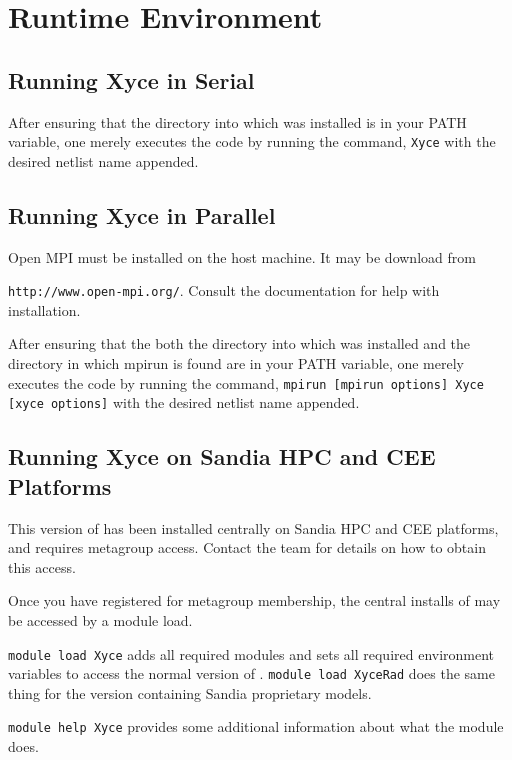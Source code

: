 \chapter{Runtime Environment}
\label{runtime}

\section{Running Xyce in Serial}

After ensuring that the directory into which \Xyce{} was installed is
in your PATH variable, one merely executes the code by running the
command, \texttt{Xyce} with the desired netlist name appended.

\section{Running Xyce in Parallel}

Open MPI must be installed on the host machine.  It may be download from 

\texttt{http://www.open-mpi.org/}.  Consult the documentation for help with installation.

After ensuring that the both the directory into which \Xyce{} was
installed and the directory in which mpirun is found are in your PATH
variable, one merely executes the code by running the command,
\texttt{mpirun [mpirun options] Xyce [xyce options]} with the desired
netlist name appended.

\section{Running Xyce on Sandia HPC and CEE Platforms}



This version of \Xyce{} has been installed centrally on Sandia HPC
and CEE platforms, and requires metagroup access.  Contact the \Xyce{} team
for details on how to obtain this access.

Once you have registered for metagroup membership, the central
installs of \Xyce{} may be accessed by a module load.

\verb+module load Xyce+ adds all required modules and sets all
required environment variables to access the normal version of
\Xyce{}.  \verb+module load XyceRad+ does the same thing for the
version \Xyce{} containing Sandia proprietary models.

\verb+module help Xyce+ provides some additional information about
what the module does.


